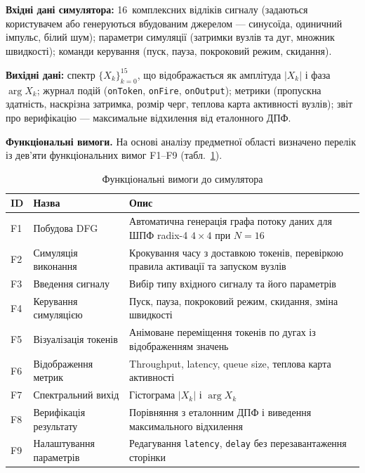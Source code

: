 \documentclass[14pt,a4paper]{extarticle}
\begin{document}
\textbf{Вхідні дані симулятора:} 16~комплексних відліків сигналу
(задаються користувачем або генеруються вбудованим джерелом ---
синусоїда, одиничний імпульс, білий шум); параметри симуляції
(затримки вузлів та дуг, множник швидкості); команди керування
(пуск, пауза, покроковий режим, скидання).

\textbf{Вихідні дані:} спектр $\{X_k\}_{k=0}^{15}$, що відображається
як амплітуда $|X_k|$ і фаза $\arg X_k$; журнал подій
(\texttt{onToken}, \texttt{onFire}, \texttt{onOutput}); метрики
(пропускна здатність, наскрізна затримка, розмір черг, теплова карта
активності вузлів); звіт про верифікацію --- максимальне відхилення
від еталонного ДПФ.

\textbf{Функціональні вимоги.}
На основі аналізу предметної області визначено перелік із дев'яти
функціональних вимог F1--F9 (табл.~\ref{tab:func_req}).

\begin{table}[H]
  \caption{Функціональні вимоги до симулятора}
  \label{tab:func_req}
  \centering
  \small
  \begin{tabular}{p{1.0cm}p{4.0cm}p{8.5cm}}
    \toprule
    ID & Назва & Опис \\
    \midrule
    F1 & Побудова DFG               & Автоматична генерація графа потоку даних для ШПФ radix-4 $4{\times}4$ при $N{=}16$ \\
    F2 & Симуляція виконання        & Крокування часу з доставкою токенів, перевіркою правила активації та запуском вузлів \\
    F3 & Введення сигналу           & Вибір типу вхідного сигналу та його параметрів \\
    F4 & Керування симуляцією       & Пуск, пауза, покроковий режим, скидання, зміна швидкості \\
    F5 & Візуалізація токенів       & Анімоване переміщення токенів по дугах із відображенням значень \\
    F6 & Відображення метрик        & Throughput, latency, queue size, теплова карта активності \\
    F7 & Спектральний вихід         & Гістограма $|X_k|$ і $\arg X_k$ \\
    F8 & Верифікація результату     & Порівняння з еталонним ДПФ і виведення максимального відхилення \\
    F9 & Налаштування параметрів    & Редагування \texttt{latency}, \texttt{delay} без перезавантаження сторінки \\
    \bottomrule
  \end{tabular}
\end{table}
\end{document}
